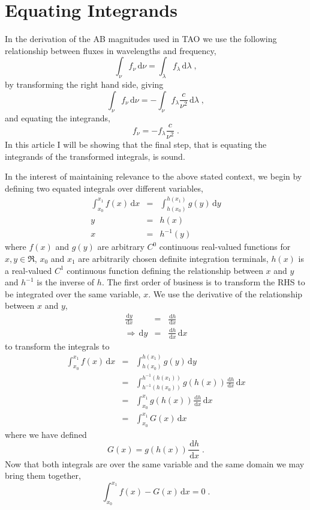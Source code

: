 \documentclass[12pt]{scrartcl}
\newcommand{\dx}[1]{\ensuremath{\,\mathrm{d}#1}}
\begin{document}
\maketitle

\section{Equating Integrands}

In the derivation of the AB magnitudes used in TAO we use the following relationship
between fluxes in wavelengths and frequency,
\[ \int_\nu f_\nu \dx{\nu} = \int_\lambda f_\lambda \dx{\lambda} \; , \]
by transforming the right hand side, giving
\[ \int_\nu f_\nu \dx{\nu} = -\int_\nu f_\lambda \frac{c}{\nu^2} \dx{\lambda} \; , \]
and equating the integrands,
\[ f_\nu = -f_\lambda \frac{c}{\nu^2} \; . \]
In this article I will be showing that the final step, that is equating the
integrands of the transformed integrals, is sound.

In the interest of maintaining relevance to the above stated context, we begin
by defining two equated integrals over different variables,
\begin{eqnarray*}
\int^{x_1}_{x_0} f(x) \dx{x} & = & \int^{h(x_1)}_{h(x_0)} g(y) \,\mathrm{d}y \\
y & = & h(x) \\
x & = & h^{-1}(y)
\end{eqnarray*}
where $f(x)$ and $g(y)$ are arbitrary $C^0$ continuous real-valued functions for $x,y \in \Re$, $x_0$ and $x_1$ are arbitrarily chosen definite integration terminals, $h(x)$ is a real-valued $C^1$ continuous function defining the relationship between $x$ and $y$ and $h^{-1}$ is the inverse of $h$. The first order of business is to transform the RHS to be integrated over the same variable, $x$. We use the derivative of the relationship between $x$ and $y$,
\begin{eqnarray*}
\frac{\,\mathrm{d}y}{\dx{x}} & = & \frac{\,\mathrm{d}h}{\dx{x}} \\
\Rightarrow \,\mathrm{d}y & = & \frac{\,\mathrm{d}h}{\dx{x}} \dx{x}
\end{eqnarray*}
to transform the integrals to
\begin{eqnarray*}
\int^{x_1}_{x_0} f(x) \dx{x} & = & \int^{h(x_1)}_{h(x_0)} g(y) \,\mathrm{d}y \\
& = & \int^{h^{-1}(h(x_1))}_{h^{-1}(h(x_0))} g(h(x)) \frac{\,\mathrm{d}h}{\dx{x}} \dx{x} \\
& = & \int^{x_1}_{x_0} g(h(x)) \frac{\,\mathrm{d}h}{\dx{x}} \dx{x} \\
& = & \int^{x_1}_{x_0} G(x) \dx{x}
\end{eqnarray*}
where we have defined
\[ G(x) = g(h(x)) \frac{\,\mathrm{d}h}{\dx{x}} \; . \]
Now that both integrals are over the same variable and the same domain we may bring them together,
\begin{equation}
\label{all_lhs}
\int^{x_1}_{x_0} f(x) - G(x) \dx{x} = 0 \; .
\end{equation}
\end{document}
